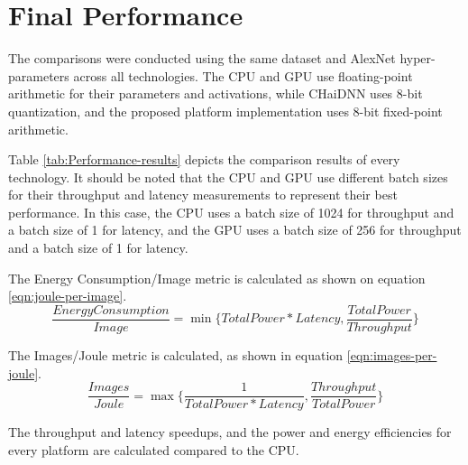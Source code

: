 \section{Final Performance}
The comparisons were conducted using the same dataset and AlexNet hyper-parameters across all technologies. The CPU and GPU use floating-point arithmetic for their parameters and activations, while CHaiDNN uses 8-bit quantization, and the proposed platform implementation uses 8-bit fixed-point arithmetic.

Table \ref{tab:Performance-results} depicts the comparison results of every technology. It should be noted that the CPU and GPU use different batch sizes for their throughput and latency measurements to represent their best performance. In this case, the CPU uses a batch size of 1024 for throughput and a batch size of 1 for latency, and the GPU uses a batch size of 256 for throughput and a batch size of 1 for latency.

The Energy Consumption/Image metric is calculated as shown on equation \ref{eqn:joule-per-image}.
\begin{equation}
	\label{eqn:joule-per-image}
	\frac{Energy Consumption}{Image} = \min \{TotalPower * Latency, \frac{TotalPower}{Throughput}\}
\end{equation}

The Images/Joule metric is calculated, as shown in equation \ref{eqn:images-per-joule}.
\begin{equation}
	\label{eqn:images-per-joule}
	\frac{Images}{Joule} = \max \{\frac{1}{TotalPower * Latency}, \frac{Throughput}{TotalPower}\}
\end{equation}

The throughput and latency speedups, and the power and energy efficiencies for every platform are calculated compared to the CPU.


